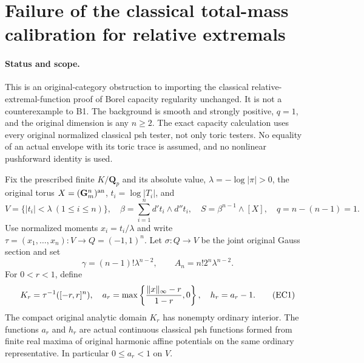 \section{Failure of the classical total-mass calibration for relative extremals}
\paragraph{Status and scope.}
This is an original-category obstruction to importing the classical
relative-extremal-function proof of Borel capacity regularity unchanged.
It is not a counterexample to B1. The background is smooth and strongly
positive, $q=1$, and the original dimension is any $n\ge2$. The exact
capacity calculation uses every original normalized classical psh tester,
not only toric testers. No equality of an actual envelope with its toric
trace is assumed, and no nonlinear pushforward identity is used.

Fix the prescribed finite $K/\mathbf Q_p$ and its absolute value,
$\lambda=-\log|\pi|>0$, the original torus $X=(\mathbf G_m^n)^{\rm an}$,
$t_i=\log|T_i|$, and
\[
 V=\{|t_i|<\lambda\ (1\le i\le n)\},\quad
 \beta=\sum_{i=1}^n d't_i\wedge d''t_i,\quad
 S=\beta^{n-1}\wedge[X],\quad q=n-(n-1)=1.
\]
Use normalized moments $x_i=t_i/\lambda$ and write
$\tau=(x_1,\ldots,x_n):V\to Q=(-1,1)^n$. Let
$\sigma:Q\to V$ be the joint original Gauss section and set
\[
 \gamma=(n-1)!\lambda^{n-2},\qquad A_n=n!2^n\lambda^{n-2}.
\]
For $0<r<1$, define
\[
 K_r=\tau^{-1}([-r,r]^n),\quad
 a_r=\max\left\{{\|x\|_\infty-r\over1-r},0\right\},\quad h_r=a_r-1.
 \tag{EC1}
\]
The compact original analytic domain $K_r$ has nonempty ordinary interior.
The functions $a_r$ and $h_r$ are actual continuous classical psh functions
formed from finite real maxima of original harmonic affine potentials on
the same ordinary representative. In particular $0\le a_r<1$ on $V$.

